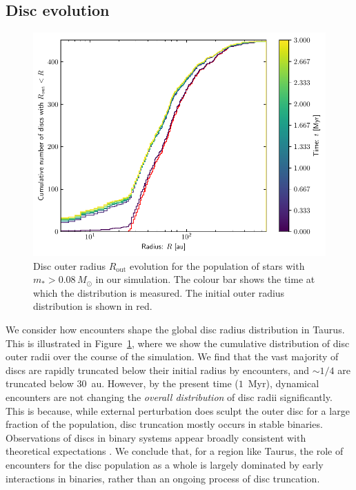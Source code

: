\documentclass{aa}
\begin{document}
\subsection{Disc evolution}

\label{sec:disc_evol}
\begin{figure}
    \centering
    \includegraphics[width=\columnwidth]{Figures/disc_r_cumulative_mRrel.pdf}
    \caption{Disc outer radius $R_\mathrm{out}$ evolution for the population of stars with $m_*>0.08 \, M_\odot$ in our simulation. The colour bar shows the time at which the distribution is measured. The initial outer radius distribution is shown in red. }
    \label{fig:disc_r_cum}
\end{figure}

We consider how encounters shape the global disc radius distribution in Taurus. This is illustrated in Figure~\ref{fig:disc_r_cum}, where we show the cumulative distribution of disc outer radii over the course of the simulation. We find that the vast majority of discs are rapidly truncated below their initial radius by encounters, and $\sim 1/4$ are truncated below $30$~au. However, by the present time ($1$~Myr), dynamical encounters are not changing the \textit{overall distribution} of disc radii significantly. This is because, while external perturbation does sculpt the outer disc for a large fraction of the population, {disc truncation mostly occurs} in stable binaries. Observations of discs in binary systems appear broadly consistent with theoretical expectations \citep{Manara19, Rota22}.  We conclude that, for a region like Taurus, the role of encounters for the disc population as a whole is largely dominated by early interactions in binaries, rather than an ongoing process of disc truncation. 
\end{document}
